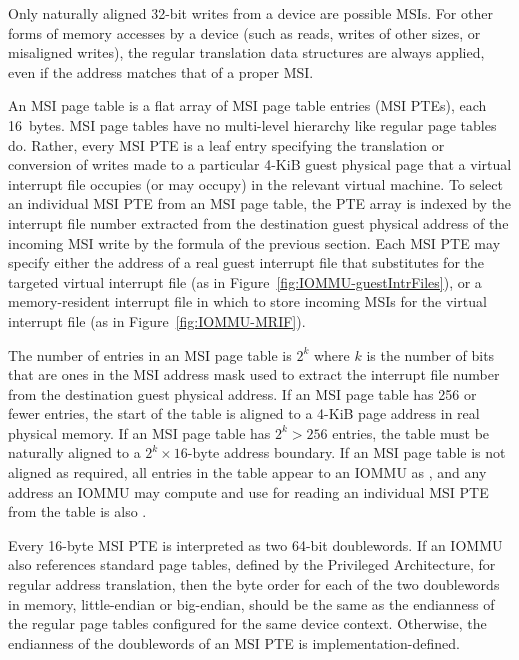 Only naturally aligned \mbox{32-bit} writes from a device are possible
MSIs.
For other forms of memory accesses by a device (such as reads, writes
of other sizes, or misaligned writes), the regular translation data
structures are always applied, even if the address matches that of a
proper MSI.

An MSI page table is a flat array of MSI page table entries (MSI PTEs),
each 16~bytes.
MSI page tables have no multi-level hierarchy like regular {\RISCV}
page tables do.
Rather, every MSI PTE is a leaf entry specifying the translation or
conversion of writes made to a particular \mbox{4-KiB} guest physical
page that a virtual interrupt file occupies (or may occupy) in the
relevant virtual machine.
To select an individual MSI PTE from an MSI page table, the PTE array
is indexed by the interrupt file number extracted from the destination
guest physical address of the incoming MSI write by the formula of the
previous section.
Each MSI PTE may specify either the address of a real guest interrupt
file that substitutes for the targeted virtual interrupt file (as in
Figure~\ref{fig:IOMMU-guestIntrFiles}), or a memory-resident interrupt
file in which to store incoming MSIs for the virtual interrupt file
(as in Figure~\ref{fig:IOMMU-MRIF}).

The number of entries in an MSI page table is
$\mbox{2}^{k}$ where $k$ is the number of bits that are
ones in the MSI address mask used to extract the interrupt file number
from the destination guest physical address.
If an MSI page table has 256 or fewer entries, the start of the table
is aligned to a \mbox{4-KiB} page address in real physical
memory.
If an MSI page table has ${\mbox{2}^{k} > \mbox{256}}$
entries, the table must be naturally aligned to a
$\mbox{2}^{k}\times \mbox{16-byte}$ address boundary.
If an MSI page table is not aligned as required, all entries in the
table appear to an \mbox{IOMMU} as {\unspecified}, and any address an
\mbox{IOMMU} may compute and use for reading an individual MSI PTE from the
table is also {\unspecified}.

Every \mbox{16-byte} MSI PTE is interpreted as two \mbox{64-bit}
doublewords.
If an \mbox{IOMMU} also references standard {\RISCV} page tables, defined by
the {\RISCV} Privileged Architecture, for regular address translation,
then the byte order for each of the two doublewords in memory,
little-endian or big-endian, should be the same as the endianness
of the regular {\RISCV} page tables configured for the same device
context.
Otherwise, the endianness of the doublewords of an MSI PTE is
implementation-defined.

